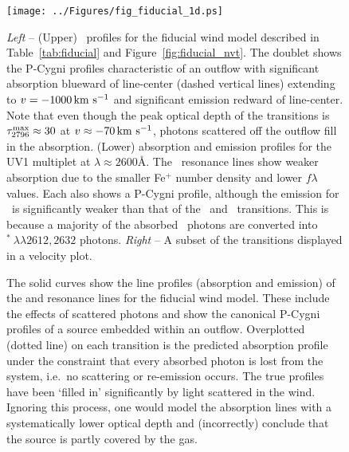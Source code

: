 \documentclass[12pt,preprint]{aastex}
\begin{document}
\begin{figure}
\texttt{[image: ../Figures/fig\_fiducial\_1d.ps]}
\caption{
{\it Left} -- (Upper) \mgiid\ profiles for the fiducial wind model
described in Table~\ref{tab:fiducial} and
Figure~\ref{fig:fiducial_nvt}.  The doublet shows the P-Cygni profiles
characteristic of an outflow with significant absorption blueward of
line-center (dashed vertical lines) extending to $v = -1000\, {\rm km~s^{-1}}$
and significant emission redward of line-center.  Note
that even though the peak optical depth of the  transitions
is $\tau_{2796}^{\rm max} \approx 30$ at $v \approx -70 \, {\rm km~s^{-1}}$,
photons scattered off the outflow fill in the absorption.
(Lower)  absorption and emission profiles for the UV1
multiplet at $\lambda \approx 2600$\AA.  The \feiid\ resonance lines 
show weaker absorption due to the smaller Fe$^+$ number density and
lower $f\lambda$ values.  Each also shows a P-Cygni profile, although
the emission for \feiia\ is significantly weaker than that of the
\feiib\ and \mgiid\ transitions.  This is because a majority of the
absorbed \feiia\ photons are converted into
$^*~\lambda\lambda 2612, 2632$ photons.
{\it Right} -- A subset of the transitions displayed in a velocity
plot.
}
\label{fig:fiducial_1d}
\end{figure}

\begin{figure}
\caption{
The solid curves show the line profiles (absorption and emission) of
the  and  resonance lines for the fiducial wind
model.  These include the effects of scattered photons and show the
canonical P-Cygni profiles of a source 
embedded within an outflow.  Overplotted (dotted line) on each transition is
the predicted absorption profile under the constraint that every
absorbed photon is lost from the system, i.e.\ no scattering or
re-emission occurs.   The true profiles have been `filled
in' significantly by light scattered in the wind.  Ignoring this
process, one would model the absorption lines with a systematically lower
optical depth and (incorrectly) conclude that the source is partly covered by the
gas.  
}
\label{fig:noemiss}
\end{figure}
\end{document}
